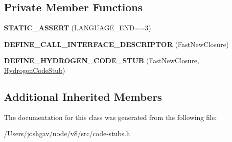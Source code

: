 \subsection*{Private Member Functions}
\begin{DoxyCompactItemize}
\item 
{\bfseries S\+T\+A\+T\+I\+C\+\_\+\+A\+S\+S\+E\+RT} (L\+A\+N\+G\+U\+A\+G\+E\+\_\+\+E\+ND==3)\hypertarget{classv8_1_1internal_1_1_fast_new_closure_stub_a01abf0c5ae9b60f6efaf9c38a7947d9c}{}\label{classv8_1_1internal_1_1_fast_new_closure_stub_a01abf0c5ae9b60f6efaf9c38a7947d9c}

\item 
{\bfseries D\+E\+F\+I\+N\+E\+\_\+\+C\+A\+L\+L\+\_\+\+I\+N\+T\+E\+R\+F\+A\+C\+E\+\_\+\+D\+E\+S\+C\+R\+I\+P\+T\+OR} (Fast\+New\+Closure)\hypertarget{classv8_1_1internal_1_1_fast_new_closure_stub_ab6c9ba655420c3a4ae495b9d2aa61664}{}\label{classv8_1_1internal_1_1_fast_new_closure_stub_ab6c9ba655420c3a4ae495b9d2aa61664}

\item 
{\bfseries D\+E\+F\+I\+N\+E\+\_\+\+H\+Y\+D\+R\+O\+G\+E\+N\+\_\+\+C\+O\+D\+E\+\_\+\+S\+T\+UB} (Fast\+New\+Closure, \hyperlink{classv8_1_1internal_1_1_hydrogen_code_stub}{Hydrogen\+Code\+Stub})\hypertarget{classv8_1_1internal_1_1_fast_new_closure_stub_a782ff9c8051a3b9780bbe899d65f665a}{}\label{classv8_1_1internal_1_1_fast_new_closure_stub_a782ff9c8051a3b9780bbe899d65f665a}

\end{DoxyCompactItemize}
\subsection*{Additional Inherited Members}


The documentation for this class was generated from the following file\+:\begin{DoxyCompactItemize}
\item 
/\+Users/joshgav/node/v8/src/code-\/stubs.\+h\end{DoxyCompactItemize}
